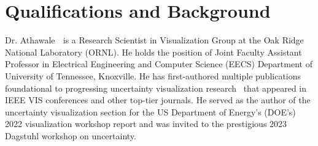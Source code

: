 




\section{Qualifications and Background}

{\large Dr. Athawale} $\;$ is a Research Scientist in Visualization Group at the Oak Ridge National Laboratory (ORNL). He holds the position of Joint Faculty Assistant Professor in Electrical Engineering and Computer Science (EECS) Department of University of Tennessee, Knoxville. He has first-authored multiple publications foundational to progressing uncertainty visualization research~\cite{TA:Athawale:2021:topoMappingUncertaintyMarchingCubes, Athawale:2021:AJE,TA:2022:Athawale:UQMorseComplex,Athawale:2019:dbsUncertainPos} that appeared in IEEE VIS conferences and other top-tier journals. He served as the author of the uncertainty visualization section for the US Department of Energy's (DOE’s) 2022 visualization workshop report and was invited to the prestigious 2023 Dagstuhl workshop on uncertainty. 

